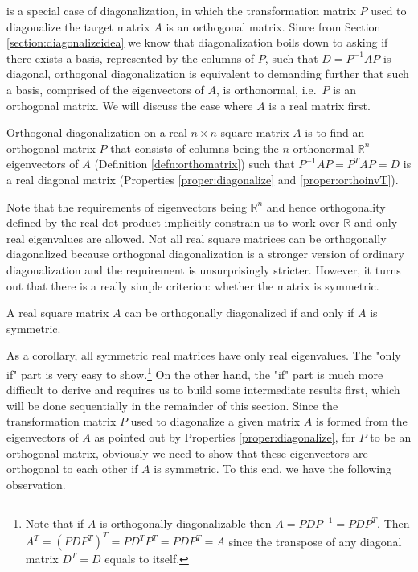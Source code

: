  is a special case of diagonalization, in which the transformation matrix $P$ used to diagonalize the target matrix $A$ is an orthogonal matrix. Since from Section \ref{section:diagonalizeidea} we know that diagonalization boils down to asking if there exists a basis, represented by the columns of $P$, such that $D = P^{-1}AP$ is diagonal, orthogonal diagonalization is equivalent to demanding further that such a basis, comprised of the eigenvectors of $A$, is orthonormal, i.e.\ $P$ is an orthogonal matrix. We will discuss the case where $A$ is a real matrix first.
\begin{defn}
\label{defn:orthodiagonal}
Orthogonal diagonalization on a real $n \times n$ square matrix $A$ is to find an orthogonal matrix $P$ that consists of columns being the $n$ orthonormal $\mathbb{R}^n$ eigenvectors of $A$ (Definition \ref{defn:orthomatrix}) such that $P^{-1}AP = P^TAP = D$ is a real diagonal matrix (Properties \ref{proper:diagonalize} and \ref{proper:orthoinvT}).
\end{defn}
Note that the requirements of eigenvectors being $\mathbb{R}^n$ and hence orthogonality defined by the real dot product implicitly constrain us to work over $\mathbb{R}$ and only real eigenvalues are allowed. Not all real square matrices can be orthogonally diagonalized because orthogonal diagonalization is a stronger version of ordinary diagonalization and the requirement is unsurprisingly stricter. However, it turns out that there is a really simple criterion: whether the matrix is symmetric.
\begin{thm}
\label{thm:symdiag}
A real square matrix $A$ can be orthogonally diagonalized if and only if $A$ is symmetric.
\end{thm}
As a corollary, all symmetric real matrices have only real eigenvalues. The "only if" part is very easy to show.\footnote{Note that if $A$ is orthogonally diagonalizable then $A = PDP^{-1} = PDP^T$. Then $A^T = (PDP^T)^T = PD^TP^T = PDP^T = A$ since the transpose of any diagonal matrix $D^T = D$ equals to itself.} On the other hand, the "if" part is much more difficult to derive and requires us to build some intermediate results first, which will be done sequentially in the remainder of this section. Since the transformation matrix $P$ used to diagonalize a given matrix $A$ is formed from the eigenvectors of $A$ as pointed out by Properties \ref{proper:diagonalize}, for $P$ to be an orthogonal matrix, obviously we need to show that these eigenvectors are orthogonal to each other if $A$ is symmetric. To this end, we have the following observation.
